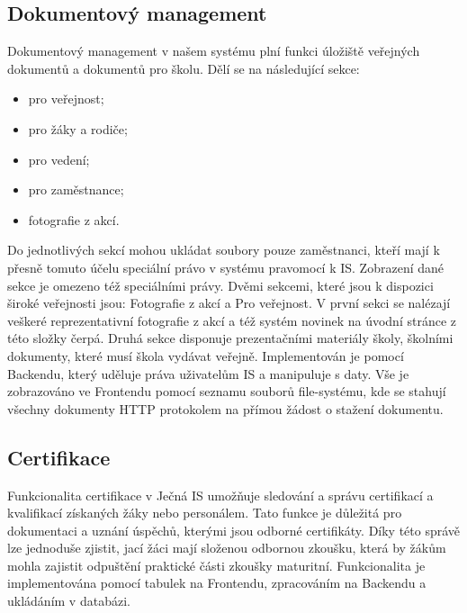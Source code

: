 \documentclass[FM,Proj]{tulthesis}
\begin{document}
\subsection*{Dokumentový management}
Dokumentový management v našem systému plní funkci úložiště veřejných dokumentů
a dokumentů pro školu. Dělí se na následující sekce:
\begin{itemize}
    \item pro veřejnost;
    \item pro žáky a rodiče;
    \item pro vedení;
    \item pro zaměstnance;
    \item fotografie z akcí.
\end{itemize}
Do jednotlivých sekcí mohou ukládat soubory pouze zaměstnanci, kteří mají k
přesně tomuto účelu speciální právo v systému pravomocí k IS. Zobrazení dané 
sekce je omezeno též speciálními právy. Dvěmi sekcemi, které jsou k dispozici
široké veřejnosti jsou: Fotografie z akcí a Pro veřejnost. V první sekci se
nalézají veškeré reprezentativní fotografie z akcí a též systém novinek na 
úvodní stránce z této složky čerpá. Druhá sekce disponuje prezentačními materiály
školy, školními dokumenty, které musí škola vydávat veřejně.
Implementován je pomocí Backendu, který uděluje práva uživatelům IS a manipuluje 
s daty. Vše je zobrazováno ve Frontendu pomocí seznamu souborů file-systému, kde
se stahují všechny dokumenty HTTP protokolem na přímou žádost o stažení dokumentu.

\subsection*{Certifikace}
Funkcionalita certifikace v Ječná IS umožňuje sledování a správu 
certifikací a kvalifikací získaných žáky nebo personálem. Tato funkce je důležitá
pro dokumentaci a uznání úspěchů, kterými jsou odborné certifikáty. Díky této 
správě lze jednoduše zjistit, jací žáci mají složenou odbornou zkoušku, 
která by žákům mohla zajistit odpuštění praktické části zkoušky maturitní.
Funkcionalita je implementována pomocí tabulek na Frontendu, zpracováním na Backendu
a ukládáním v databázi.
\end{document}
